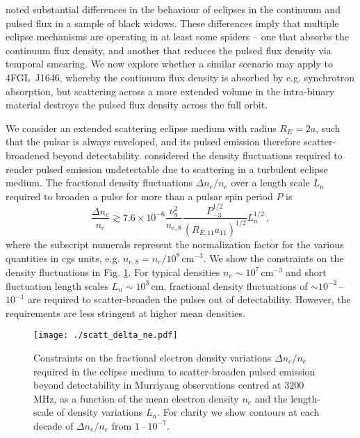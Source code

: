 \documentclass[fleqn,usenatbib]{mnras}
\newcommand{\blinky}{{4FGL}~J1646}
\begin{document}
\citet{2020MNRAS.494.2948P} noted substantial differences in the behaviour of eclipses in the continuum and pulsed flux in a sample of black widows. These differences imply that multiple eclipse mechanisms are operating in at least some spiders -- one that absorbs the continuum flux density, and another that reduces the pulsed flux density via temporal smearing. We now explore whether a similar scenario may apply to \blinky{}, whereby the continuum flux density is absorbed by e.g. synchrotron absorption, but scattering across a more extended volume in the intra-binary material destroys the pulsed flux density across the full orbit.

We consider an extended scattering eclipse medium with radius $R_E = 2a$, such that the pulsar is always enveloped, and its pulsed emission therefore scatter-broadened beyond detectability. \citet{1994ApJ...422..304T} considered the density fluctuations required to render pulsed emission undetectable due to scattering in a turbulent eclipse medium. The fractional density fluctuations $\Delta n_e / n_e$ over a length scale $L_{n}$ required to broaden a pulse for more than a pulsar spin period $P$ is \citep{1994ApJ...422..304T}
\begin{equation}
    \frac{\Delta n_e}{n_e} \gtrsim 7.6\times 10^{-6} \frac{\nu_9^2}{n_{e,8}}\frac{P_{-3}^{1/2}}{(R_{E,11} a_{11})^{1/2}} L_n^{1/2}\,,
\end{equation}
where the subscript numerals represent the normalization factor for the various quantities in cgs units, e.g. $n_{e,8} = n_e / 10^{8}\,\mathrm{cm}^{-3}$. We show the constraints on the density fluctuations in Fig. \ref{fig:delta_ne_scatt}. For typical densities $n_e\sim 10^{7}\,\mathrm{cm}^{-3}$ and short fluctuation length scales $L_n \sim 10^3\,\mathrm{cm}$, fractional density fluctuations of $\sim 10^{-2}$\,--\,$10^{-1}$ are required to scatter-broaden the pulses out of detectability. However, the requirements are less stringent at higher mean densities.

\begin{figure}
    \texttt{[image: ./scatt\_delta\_ne.pdf]}
    \caption{Constraints on the fractional electron density variations $\Delta n_e/ n_e$ required in the eclipse medium to scatter-broaden pulsed emission beyond detectability in Murriyang observations centred at 3200\,MHz, as a function of the mean electron density $n_e$ and the length-scale of density variations $L_{n}$. For clarity we show contours at each decade of $\Delta n_e / n_e$ from $1$\,--\,$10^{-7}$.\label{fig:delta_ne_scatt}}
\end{figure}
\end{document}
